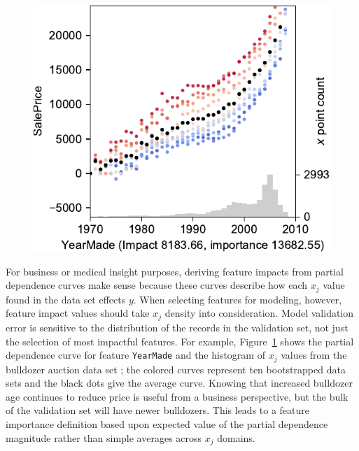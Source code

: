 \documentclass[11pt]{article}
\newcommand{\figref}[1]{Figure~\ref{#1}}
\begin{document}
\begin{figure}[htbp]
\begin{center}
\includegraphics[scale=0.5]{images/bulldozer-YearMade.pdf}
\label{fig:yearmade}
\end{center}
\end{figure}

For business or medical insight purposes, deriving feature impacts from partial dependence curves make sense because these curves describe how each $x_j$ value found in the data set effects $y$. When selecting features for modeling, however, feature impact values should take $x_j$ density into consideration. Model validation error is sensitive to the distribution of the records in the validation set, not just the selection of most impactful features.  For example, \figref{fig:yearmade} shows the partial dependence curve for feature {\tt\small YearMade} and the histogram of $x_j$ values from the bulldozer auction data set \citep{bulldozer}; the colored curves represent ten bootstrapped data sets and the black dots give the average curve.  Knowing that increased bulldozer age continues to reduce price is useful from a business perspective, but the bulk of the validation set will have newer bulldozers.  This leads to a feature importance definition based upon expected value of the partial dependence magnitude rather than simple averages across $x_j$ domains.
\end{document}
